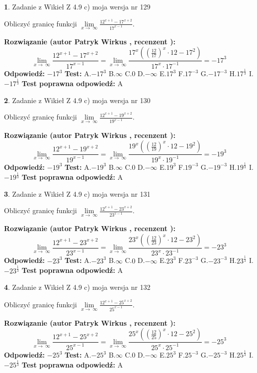 \documentclass[12pt, a4paper]{article}
\theoremstyle{definition} %
\newtheorem{zad}{}
\newcommand{\zadStart}[1]{\begin{zad}#1\newline}
\newcommand{\zadStop}{\end{zad}}
\newcommand{\rozwStart}[2]{\noindent \textbf{Rozwiązanie (autor #1 , recenzent #2): }\newline}
\newcommand{\rozwStop}{\newline}
\newcommand{\odpStart}{\noindent \textbf{Odpowiedź:}\newline}
\newcommand{\odpStop}{\newline}
\newcommand{\testStart}{\noindent \textbf{Test:}\newline}
\newcommand{\testStop}{\newline}
\newcommand{\kluczStart}{\noindent \textbf{Test poprawna odpowiedź:}\newline}
\newcommand{\kluczStop}{\newline}
\begin{document}
\zadStart{Zadanie z Wikieł Z 4.9 c) moja wersja nr 129}


Obliczyć granicę funkcji  $\lim\limits_{x\to\ \infty}\frac{12^{x+1}-17^{x+2}}{17^{x-1}}$.
\zadStop
\rozwStart{Patryk Wirkus}{}
$$\lim\limits_{x\to\ \infty}\frac{12^{x+1}-17^{x+2}}{17^{x-1}}=\lim\limits_{x\to\ \infty}\frac{17^{x}((\frac{12}{17})^{x}\cdot 12 -17^{2})}{17^{x}\cdot 17^{-1}} = -17^{3}$$
\rozwStop
\odpStart
$-17^{3}$
\odpStop
\testStart
A.$-17^{3}$ B.$\infty$ C.$0$ D.$-\infty$ E.$17^{3}$
F.$17^{-3}$ G.$-17^{-3}$
H.$17^{\frac{1}{3}}$
I.$-17^{\frac{1}{3}}$
\testStop
\kluczStart
A
\kluczStop



\zadStart{Zadanie z Wikieł Z 4.9 c) moja wersja nr 130}


Obliczyć granicę funkcji  $\lim\limits_{x\to\ \infty}\frac{12^{x+1}-19^{x+2}}{19^{x-1}}$.
\zadStop
\rozwStart{Patryk Wirkus}{}
$$\lim\limits_{x\to\ \infty}\frac{12^{x+1}-19^{x+2}}{19^{x-1}}=\lim\limits_{x\to\ \infty}\frac{19^{x}((\frac{12}{19})^{x}\cdot 12 -19^{2})}{19^{x}\cdot 19^{-1}} = -19^{3}$$
\rozwStop
\odpStart
$-19^{3}$
\odpStop
\testStart
A.$-19^{3}$ B.$\infty$ C.$0$ D.$-\infty$ E.$19^{3}$
F.$19^{-3}$ G.$-19^{-3}$
H.$19^{\frac{1}{3}}$
I.$-19^{\frac{1}{3}}$
\testStop
\kluczStart
A
\kluczStop



\zadStart{Zadanie z Wikieł Z 4.9 c) moja wersja nr 131}


Obliczyć granicę funkcji  $\lim\limits_{x\to\ \infty}\frac{12^{x+1}-23^{x+2}}{23^{x-1}}$.
\zadStop
\rozwStart{Patryk Wirkus}{}
$$\lim\limits_{x\to\ \infty}\frac{12^{x+1}-23^{x+2}}{23^{x-1}}=\lim\limits_{x\to\ \infty}\frac{23^{x}((\frac{12}{23})^{x}\cdot 12 -23^{2})}{23^{x}\cdot 23^{-1}} = -23^{3}$$
\rozwStop
\odpStart
$-23^{3}$
\odpStop
\testStart
A.$-23^{3}$ B.$\infty$ C.$0$ D.$-\infty$ E.$23^{3}$
F.$23^{-3}$ G.$-23^{-3}$
H.$23^{\frac{1}{3}}$
I.$-23^{\frac{1}{3}}$
\testStop
\kluczStart
A
\kluczStop



\zadStart{Zadanie z Wikieł Z 4.9 c) moja wersja nr 132}


Obliczyć granicę funkcji  $\lim\limits_{x\to\ \infty}\frac{12^{x+1}-25^{x+2}}{25^{x-1}}$.
\zadStop
\rozwStart{Patryk Wirkus}{}
$$\lim\limits_{x\to\ \infty}\frac{12^{x+1}-25^{x+2}}{25^{x-1}}=\lim\limits_{x\to\ \infty}\frac{25^{x}((\frac{12}{25})^{x}\cdot 12 -25^{2})}{25^{x}\cdot 25^{-1}} = -25^{3}$$
\rozwStop
\odpStart
$-25^{3}$
\odpStop
\testStart
A.$-25^{3}$ B.$\infty$ C.$0$ D.$-\infty$ E.$25^{3}$
F.$25^{-3}$ G.$-25^{-3}$
H.$25^{\frac{1}{3}}$
I.$-25^{\frac{1}{3}}$
\testStop
\kluczStart
A
\kluczStop
\end{document}
